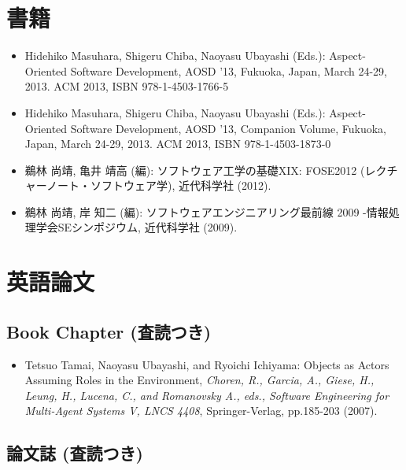 \documentclass{jarticle}
\begin{document}
\section{書籍}

\begin{itemize}
\item Hidehiko Masuhara, Shigeru Chiba, Naoyasu Ubayashi (Eds.): Aspect-Oriented Software Development, AOSD '13, Fukuoka, Japan, March 24-29, 2013. ACM 2013, ISBN 978-1-4503-1766-5

\item Hidehiko Masuhara, Shigeru Chiba, Naoyasu Ubayashi (Eds.): Aspect-Oriented Software Development, AOSD '13, Companion Volume, Fukuoka, Japan, March 24-29, 2013. ACM 2013, ISBN 978-1-4503-1873-0

\item 鵜林 尚靖, 亀井 靖高 (編):
ソフトウェア工学の基礎XIX: FOSE2012 (レクチャーノート・ソフトウェア学),
近代科学社 (2012).

\item 鵜林 尚靖, 岸 知二 (編):
ソフトウェアエンジニアリング最前線 2009 -情報処理学会SEシンポジウム,
近代科学社 (2009).
\end{itemize}


\section{英語論文}

\subsection{Book Chapter (査読つき)}

\begin{itemize}
\item Tetsuo Tamai, Naoyasu Ubayashi, and Ryoichi Ichiyama:
Objects as Actors Assuming Roles in the Environment,
{\em Choren, R., Garcia, A., Giese, H., Leung, H., Lucena, C., and Romanovsky
A., eds., Software Engineering for Multi-Agent Systems V,
LNCS 4408}, Springer-Verlag, pp.185-203 (2007).
\end{itemize}


\subsection{論文誌 (査読つき)}
\end{document}
